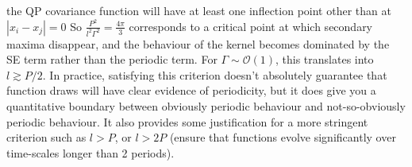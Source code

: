 \documentclass[useAMS, usenatbib, preprint, 12pt]{aastex}
\newcommand{\vrcomment}[1]{{\color{magenta}#1}}
\begin{document}
\begin{itemize}
{\begin{equation}
        \end{equation}
        the QP covariance function will have at least one inflection point
        other than at $|x_i-x_j|=0$
        So $\frac{{{P^2}}}{{{l^2}{\Gamma ^2}}} = \frac{{4\pi }}{3}$
        corresponds to a critical point at which secondary maxima disappear,
        and the behaviour of the kernel becomes dominated by the SE term
        rather than the periodic term.
        For $\Gamma\sim\mathcal{O}(1)$, this translates into $l\gtrsim P/2$.
        In practice, satisfying this criterion doesn't absolutely guarantee
        that function draws will have clear evidence of periodicity, but it
        does give you a quantitative boundary between obviously periodic
        behaviour and not-so-obviously periodic behaviour.
        It also provides some justification for a more stringent criterion
        such as $l>P$, or $l>2P$ (ensure that functions
        evolve significantly over time-scales longer than 2 periods).}

\end{itemize}
\end{document}
